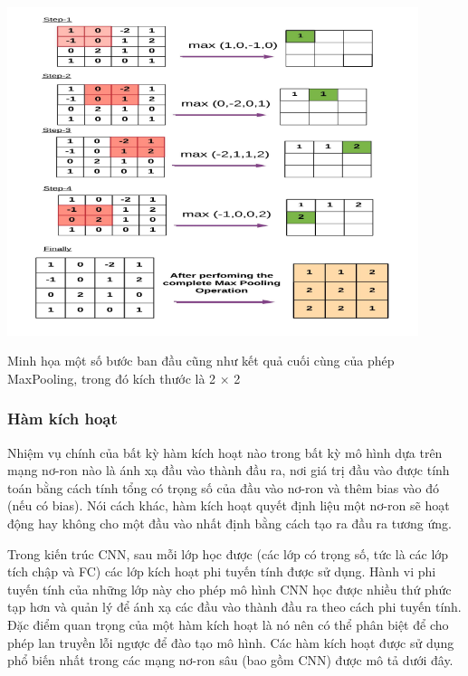 \begin{minipage}{\linewidth}
        \captionsetup{type=figure}
        \centering
        \includegraphics[width=0.9\textwidth]{images/pooling_layer.png}
        \caption{Minh họa một số bước ban đầu cũng như kết quả cuối cùng của phép MaxPooling, trong đó kích thước là 2 × 2}
\end{minipage}

\subsubsection{Hàm kích hoạt}

Nhiệm vụ chính của bất kỳ hàm kích hoạt nào trong bất kỳ mô hình dựa trên mạng nơ-ron nào là ánh xạ đầu vào thành đầu ra, nơi giá trị đầu vào được tính toán bằng cách tính tổng có trọng số của đầu vào nơ-ron và thêm bias vào đó (nếu có bias). Nói cách khác, hàm kích hoạt quyết định liệu một nơ-ron sẽ hoạt động hay không cho một đầu vào nhất định bằng cách tạo ra đầu ra tương ứng.

Trong kiến trúc CNN, sau mỗi lớp học được (các lớp có trọng số, tức là các lớp tích chập và FC) các lớp kích hoạt phi tuyến tính được sử dụng. Hành vi phi tuyến tính của những lớp này cho phép mô hình CNN học được nhiều thứ phức tạp hơn và quản lý để ánh xạ các đầu vào thành đầu ra theo cách phi tuyến tính. Đặc điểm quan trọng của một hàm kích hoạt là nó nên có thể phân biệt để cho phép lan truyền lỗi ngược để đào tạo mô hình. Các hàm kích hoạt được sử dụng phổ biến nhất trong các mạng nơ-ron sâu (bao gồm CNN) được mô tả dưới đây.

